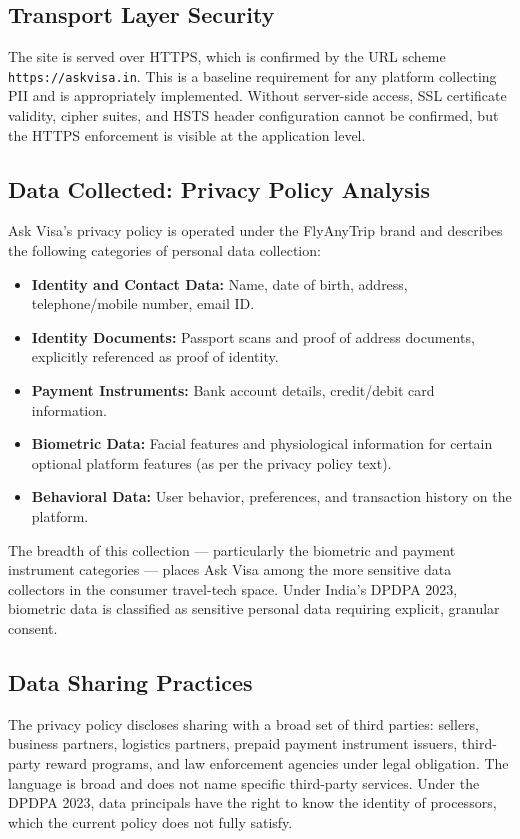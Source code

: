 \documentclass[journal, 10pt, twoside]{IEEEtran}
\begin{document}
\subsection{Transport Layer Security}
The site is served over HTTPS, which is confirmed by the URL scheme
\texttt{https://askvisa.in}. This is a baseline requirement for any
platform collecting PII and is appropriately implemented. Without
server-side access, SSL certificate validity, cipher suites, and
HSTS header configuration cannot be confirmed, but the HTTPS
enforcement is visible at the application level.

\subsection{Data Collected: Privacy Policy Analysis}
Ask Visa's privacy policy is operated under the FlyAnyTrip brand and
describes the following categories of personal data collection:

\begin{itemize}
  \item \textbf{Identity and Contact Data:} Name, date of birth, address,
  telephone/mobile number, email ID.
  \item \textbf{Identity Documents:} Passport scans and proof of address
  documents, explicitly referenced as proof of identity.
  \item \textbf{Payment Instruments:} Bank account details, credit/debit
  card information.
  \item \textbf{Biometric Data:} Facial features and physiological
  information for certain optional platform features (as per the privacy
  policy text).
  \item \textbf{Behavioral Data:} User behavior, preferences, and
  transaction history on the platform.
\end{itemize}

The breadth of this collection --- particularly the biometric and
payment instrument categories --- places Ask Visa among the more
sensitive data collectors in the consumer travel-tech space. Under
India's DPDPA 2023, biometric data is classified as sensitive personal
data requiring explicit, granular consent.

\subsection{Data Sharing Practices}
The privacy policy discloses sharing with a broad set of third parties:
sellers, business partners, logistics partners, prepaid payment
instrument issuers, third-party reward programs, and law enforcement
agencies under legal obligation. The language is broad and does not name
specific third-party services. Under the DPDPA 2023, data principals
have the right to know the identity of processors, which the current
policy does not fully satisfy.
\end{document}
